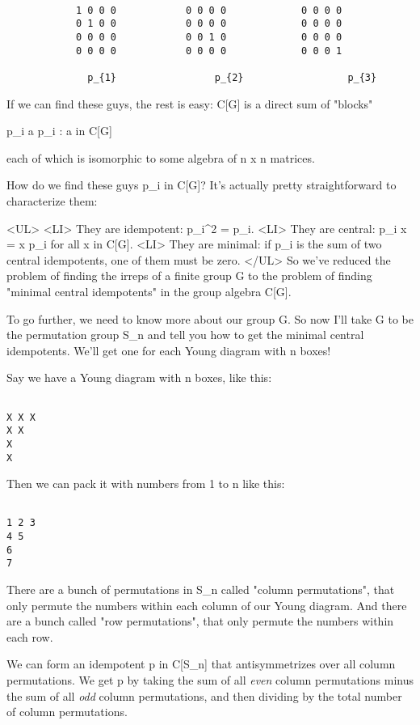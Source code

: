 \begin{verbatim}

            1 0 0 0            0 0 0 0             0 0 0 0 
            0 1 0 0            0 0 0 0             0 0 0 0 
            0 0 0 0            0 0 1 0             0 0 0 0 
            0 0 0 0            0 0 0 0             0 0 0 1

              p_{1}                 p_{2}                  p_{3}
\end{verbatim}
    
If we can find these guys, the rest is easy: C[G] is a direct sum of
"blocks"

                    {p_{i} a p_{i} : a in C[G]}

each of which is isomorphic to some algebra of n x n matrices.

How do we find these guys p_{i} in C[G]?  It's actually pretty
straightforward to characterize them:

<UL>
<LI> They are idempotent: p_{i}^{2} = p_{i}.
<LI> They are central: p_{i} x = x p_{i} for all x in C[G].
<LI> They are minimal: if p_{i} is the sum of two central idempotents, one 
   of them must be zero.
</UL>
So we've reduced the problem of finding the irreps of a finite group G
to the problem of finding "minimal central idempotents" in the group 
algebra C[G].

To go further, we need to know more about our group G.  So now I'll take
G to be the permutation group S_{n} and tell you how to get the minimal
central idempotents.  We'll get one for each Young diagram with n boxes!

Say we have a Young diagram with n boxes, like this:


\begin{verbatim}

X X X
X X
X
X
\end{verbatim}
    
Then we can pack it with numbers from 1 to n like this:


\begin{verbatim}

1 2 3
4 5
6
7
\end{verbatim}
    
There are a bunch of permutations in S_{n} called "column
permutations", that only permute the numbers within each column of
our Young diagram.  And there are a bunch called "row
permutations", that only permute the numbers within each row.

We can form an idempotent p in C[S_{n}] that antisymmetrizes over all 
column permutations.  We get p by taking the sum of all \emph{even} column
permutations minus the sum of all \emph{odd} column permutations, and then
dividing by the total number of column permutations.

